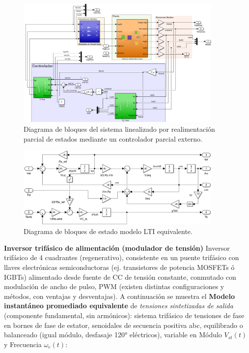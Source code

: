 \documentclass{article}
\begin{document}
\begin{figure}[H]
    \centering
    \includegraphics[width=0.9\textwidth]{Imagenes/BloquesLinealizacionRealimentacionNoLineal.png}
    \caption{Diagrama de bloques del sistema linealizado por realimentación parcial de estados mediante un controlador parcial externo.}
    \label{fig:BloquesControladorParcialNoLineal}
\end{figure}
\begin{figure}[H]
    \centering
    \includegraphics[width=0.9\textwidth]{Imagenes/SistEqLTI.png}
    \caption{Diagrama de bloques de estado modelo LTI equivalente.}
    \label{fig:SistEqLTI}
\end{figure}

\noindent\textbf{Inversor trifásico de alimentación (modulador de tensión)}
Inversor trifásico de 4 cuadrantes (regenerativo), consistente en un puente trifásico con llaves electrónicas semiconductoras (ej. transistores de potencia MOSFETs ó IGBTs) alimentado desde fuente de CC de tensión constante, conmutado con modulación de ancho de pulso, PWM (existen distintas configuraciones y métodos, con ventajas y desventajas).
A continuación se muestra el \textbf{Modelo instantáneo promediado equivalente} de \textit{tensiones sintetizadas de salida} (componente fundamental, sin armónicos): sistema trifásico de tensiones de fase en bornes de fase de estator, senoidales de secuencia positiva abc, equilibrado o balanceado (igual módulo, desfasaje 120° eléctricos), variable en Módulo $V_{st}(t)$ y Frecuencia $\omega_e(t)$:
\end{document}
